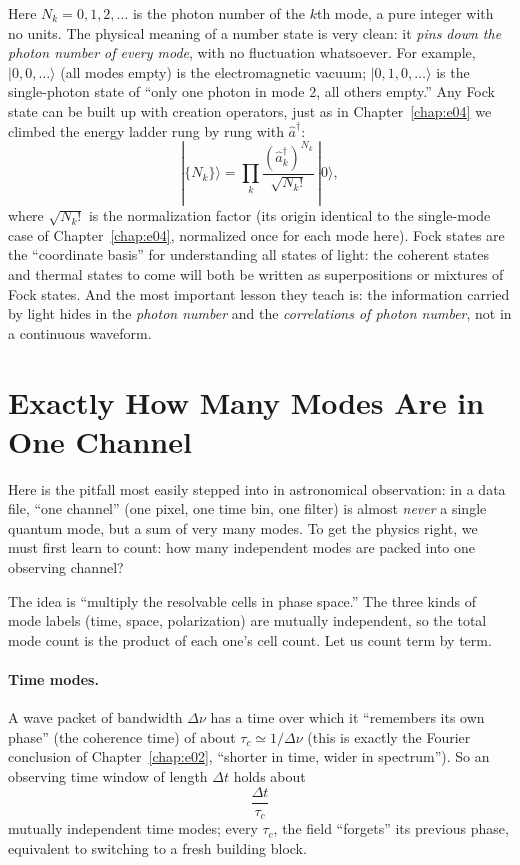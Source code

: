 Here \(N_k=0,1,2,\dots\) is the photon number of the \(k\)th mode, a pure integer with no units. The physical meaning of a number state is very clean: it \emph{pins down the photon number of every mode}, with no fluctuation whatsoever. For example, \(|0,0,\dots\rangle\) (all modes empty) is the electromagnetic vacuum; \(|0,1,0,\dots\rangle\) is the single-photon state of ``only one photon in mode 2, all others empty.'' Any Fock state can be built up with creation operators, just as in Chapter~\ref{chap:e04} we climbed the energy ladder rung by rung with \(\hat a^\dagger\):
\[
  |\{N_k\}\rangle=\prod_k\frac{(\hat a_k^\dagger)^{N_k}}{\sqrt{N_k!}}\,|0\rangle,
\]
where \(\sqrt{N_k!}\) is the normalization factor (its origin identical to the single-mode case of Chapter~\ref{chap:e04}, normalized once for each mode here). Fock states are the ``coordinate basis'' for understanding all states of light: the coherent states and thermal states to come will both be written as superpositions or mixtures of Fock states. And the most important lesson they teach is: the information carried by light hides in the \emph{photon number} and the \emph{correlations of photon number}, not in a continuous waveform.

\section{Exactly How Many Modes Are in One Channel}
\label{sec:e05-mode-count}

Here is the pitfall most easily stepped into in astronomical observation: in a data file, ``one channel'' (one pixel, one time bin, one filter) is almost \emph{never} a single quantum mode, but a sum of very many modes. To get the physics right, we must first learn to count: how many independent modes are packed into one observing channel?

The idea is ``multiply the resolvable cells in phase space.'' The three kinds of mode labels (time, space, polarization) are mutually independent, so the total mode count is the product of each one's cell count. Let us count term by term.

\paragraph{Time modes.} A wave packet of bandwidth \(\Delta\nu\) has a time over which it ``remembers its own phase'' (the coherence time) of about \(\tau_c\simeq1/\Delta\nu\) (this is exactly the Fourier conclusion of Chapter~\ref{chap:e02}, ``shorter in time, wider in spectrum''). So an observing time window of length \(\Delta t\) holds about
\[
  \frac{\Delta t}{\tau_c}
\]
mutually independent time modes; every \(\tau_c\), the field ``forgets'' its previous phase, equivalent to switching to a fresh building block.

